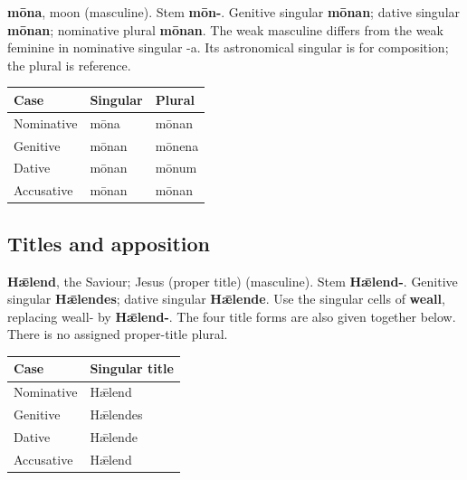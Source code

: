 \textbf{mōna}, moon (masculine). Stem \textbf{mōn-}. Genitive singular \textbf{mōnan}; dative singular \textbf{mōnan}; nominative plural \textbf{mōnan}. The weak masculine differs from the weak feminine in nominative singular -a. Its astronomical singular is for composition; the plural is reference.

\par\begingroup
\fontsize{10.5}{13.2}\selectfont
\setlength{\LTleft}{0pt}\setlength{\LTright}{\fill}
\noindent
\begin{tabular}{@{}>{\raggedright\arraybackslash}p{39.46mm}>{\raggedright\arraybackslash}p{39.46mm}>{\raggedright\arraybackslash}p{39.46mm}@{}}
\toprule
\textbf{Case} & \textbf{Singular} & \textbf{Plural} \\
\midrule
Nominative & mōna & mōnan \\
Genitive & mōnan & mōnena \\
Dative & mōnan & mōnum \\
Accusative & mōnan & mōnan \\
\bottomrule
\end{tabular}
\par\endgroup

\subsection*{Titles and apposition}

\textbf{Hǣlend}, the Saviour; Jesus (proper title) (masculine). Stem \textbf{Hǣlend-}. Genitive singular \textbf{Hǣlendes}; dative singular \textbf{Hǣlende}. Use the singular cells of \textbf{weall}, replacing weall- by \textbf{Hǣlend-}. The four title forms are also given together below. There is no assigned proper-title plural.

\par\begingroup
\fontsize{10.5}{13.2}\selectfont
\setlength{\LTleft}{0pt}\setlength{\LTright}{\fill}
\noindent
\begin{tabular}{@{}>{\raggedright\arraybackslash}p{58.54mm}>{\raggedright\arraybackslash}p{62.64mm}@{}}
\toprule
\textbf{Case} & \textbf{Singular title} \\
\midrule
Nominative & Hǣlend \\
Genitive & Hǣlendes \\
Dative & Hǣlende \\
Accusative & Hǣlend \\
\bottomrule
\end{tabular}
\par\endgroup

